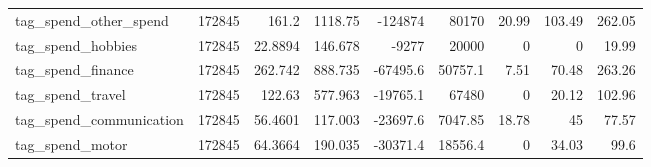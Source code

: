 \begin{tabular}{lrrrrrrrr}
 tag\_spend\_other\_spend   &  172845 &  161.2     &  1118.75     & -124874       &  80170       &   20.99    &  103.49     &  262.05    \\
 tag\_spend\_hobbies       &  172845 &   22.8894  &   146.678    &   -9277       &  20000       &    0       &    0        &   19.99    \\
 tag\_spend\_finance       &  172845 &  262.742   &   888.735    &  -67495.6     &  50757.1     &    7.51    &   70.48     &  263.26    \\
 tag\_spend\_travel        &  172845 &  122.63    &   577.963    &  -19765.1     &  67480       &    0       &   20.12     &  102.96    \\
 tag\_spend\_communication &  172845 &   56.4601  &   117.003    &  -23697.6     &   7047.85    &   18.78    &   45        &   77.57    \\
 tag\_spend\_motor         &  172845 &   64.3664  &   190.035    &  -30371.4     &  18556.4     &    0       &   34.03     &   99.6     \\
\bottomrule
\end{tabular}
